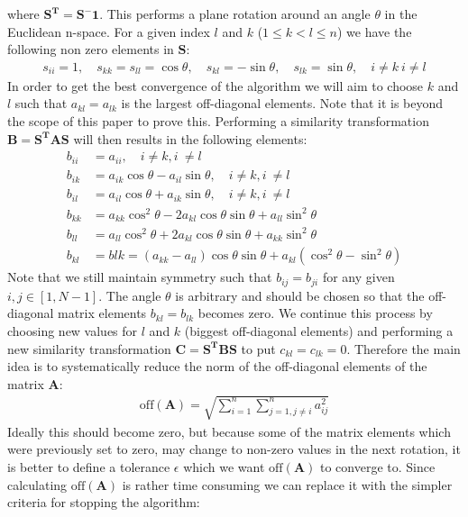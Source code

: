 \documentclass[american,a4paper,12pt]{article}
\renewcommand{\vec}[1]{\mathbf{#1}} %
\begin{document}
where $\vec{S^T} = \vec{S^-1}$. This performs a plane rotation around an angle $\theta$ in the Euclidean n-space. For a given index $l$ and $k$ ($1 \le k < l \le n$) we have the following non zero elements in $\vec{S}$:
\begin{align*}
    s_{ii} = 1, \quad s_{kk} = s_{ll} = \cos{\theta}, \quad s_{kl} = -\sin{\theta}, \quad s_{lk} = \sin{\theta}, \quad i \ne k \  i \ne l
\end{align*}
In order to get the best convergence of the algorithm we will aim to choose $k$ and $l$ such that $a_{kl} = a_{lk}$ is the largest off-diagonal elements. Note that it is beyond the scope of this paper to prove this.  Performing a similarity transformation $\vec{B} = \vec{S^T}\vec{A}\vec{S}$ will then results in the following elements:
\begin{align*}
    b_{ii} &= a_{ii},  \quad i \ne k, i \ \ne l\\
    b_{ik} &= a_{ik}\cos{\theta} - a_{il}\sin{\theta}, \quad i \ne k, i \ \ne l\\
    b_{il} &= a_{il}\cos{\theta} + a_{ik}\sin{\theta}, \quad i \ne k, i \ \ne l\\
    b_{kk} &= a_{kk}\cos^2{\theta} - 2a_{kl}\cos{\theta}\sin{\theta} + a_{ll}\sin^2{\theta} \\
    b_{ll} &= a_{ll}\cos^2{\theta} + 2a_{kl}\cos{\theta}\sin{\theta} + a_{kk}\sin^2{\theta} \\
    b_{kl} &= b{lk} = (a_{kk} - a_{ll})\cos{\theta}\sin{\theta} + a_{kl}(\cos^2{\theta} - \sin^2{\theta})
\end{align*}
Note that we still maintain symmetry such that $b_{ij} = b_{ji}$ for any given $i, j \in [1,N-1]$. The angle $\theta$ is arbitrary and should be chosen so that the off-diagonal matrix elements $b_{kl} = b_{lk}$ becomes zero. We continue this process by choosing new values for $l$ and $k$ (biggest off-diagonal elements) and performing a new similarity transformation $\vec{C} = \vec{S^T}\vec{B}\vec{S}$ to put $c_{kl} = c_{lk} = 0$. Therefore the main idea is to systematically reduce the norm of the off-diagonal elements of the matrix $\vec{A}$:
\begin{align*}
    \text{off}(\vec{A}) = \sqrt{\sum_{i=1}^n\sum_{j=1,j\ne i}^n a^2_{ij}}
\end{align*}
Ideally this should become zero, but because some of the matrix elements which were previously set to zero, may change to non-zero values in the next rotation, it is better to define a tolerance $\epsilon$ which we want $\text{off}(\vec{A})$ to converge to. Since calculating $\text{off}(\vec{A})$ is rather time consuming we can replace it with the simpler criteria for stopping the algorithm: 
\end{document}
